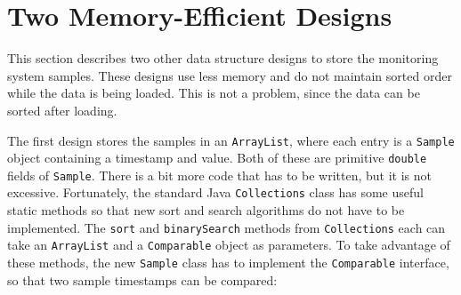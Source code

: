 \documentclass{book}
\theoremstyle{definition}
\begin{document}
\section{Two Memory-Efficient Designs}
\label{better-designs} 

This section describes two other data structure designs to store the monitoring system samples. These designs use less memory and do not maintain sorted order while the data is being loaded. This is not a problem, since the data can be sorted after loading. 

The first design stores the samples in an \texttt{ArrayList}, where each entry is a \texttt{Sample} object containing a timestamp and value. Both of these are primitive \texttt{double} fields of \texttt{Sample}.  There is a bit more code that has to be written, but it is not excessive. Fortunately, the standard Java \texttt{Collections} class has some useful static methods so that new sort and search algorithms do not have to be implemented. The \texttt{sort} and \texttt{binarySearch} methods from \texttt{Collections} each can take an \texttt{ArrayList} and a \texttt{Comparable} object as parameters. To take advantage of these methods, the new \texttt{Sample} class has to implement the \texttt{Comparable} interface, so that two sample timestamps can be compared:  
\end{document}
